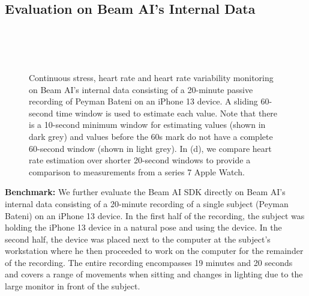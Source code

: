 \documentclass{article}
\begin{document}
\subsection{Evaluation on Beam AI's Internal Data}
\label{sec:iphone-data}

\begin{figure}[t]
    \centering
     \\
    \vspace{-0.1in}
     \\
    \vspace{-0.1in}
    \\
    \vspace{-0.1in}
    \caption{Continuous stress, heart rate and heart rate variability monitoring on Beam AI's internal data consisting of a 20-minute passive recording of Peyman Bateni on an iPhone 13 device. A sliding 60-second time window is used to estimate each value. Note that there is a 10-second minimum window for estimating values (shown in dark grey) and values before the 60s mark do not have a complete 60-second window (shown in light grey). In (d), we compare heart rate estimation over shorter 20-second windows to provide a comparison to measurements from a series 7 Apple Watch.}
    \label{fig:beam-ai-data}
    \vspace{-0.2in}
\end{figure}

\textbf{Benchmark:} We further evaluate the Beam AI SDK directly on Beam AI's internal data consisting of a 20-minute recording of a single subject (Peyman Bateni) on an iPhone 13 device. In the first half of the recording, the subject was holding the iPhone 13 device in a natural pose and using the device. In the second half, the device was placed next to the computer at the subject's workstation where he then proceeded to work on the computer for the remainder of the recording. The entire recording encompasses 19 minutes and 20 seconds and covers a range of movements when sitting and changes in lighting due to the large monitor in front of the subject.
\end{document}
